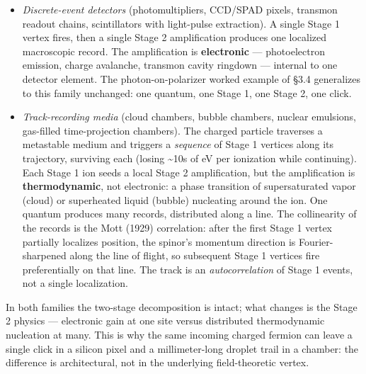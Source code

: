 \documentclass[
]{article}
\providecommand{\tightlist}{%
  \setlength{\itemsep}{0pt}\setlength{\parskip}{0pt}}
\begin{document}
\begin{itemize}
\tightlist
\item
  \emph{Discrete-event detectors} (photomultipliers, CCD/SPAD pixels,
  transmon readout chains, scintillators with light-pulse extraction). A
  single Stage 1 vertex fires, then a single Stage 2 amplification
  produces one localized macroscopic record. The amplification is
  \textbf{electronic} --- photoelectron emission, charge avalanche,
  transmon cavity ringdown --- internal to one detector element. The
  photon-on-polarizer worked example of §3.4 generalizes to this family
  unchanged: one quantum, one Stage 1, one Stage 2, one click.
\item
  \emph{Track-recording media} (cloud chambers, bubble chambers, nuclear
  emulsions, gas-filled time-projection chambers). The charged particle
  traverses a metastable medium and triggers a \emph{sequence} of Stage
  1 vertices along its trajectory, surviving each (losing
  \textasciitilde10s of eV per ionization while continuing). Each Stage
  1 ion seeds a local Stage 2 amplification, but the amplification is
  \textbf{thermodynamic}, not electronic: a phase transition of
  supersaturated vapor (cloud) or superheated liquid (bubble) nucleating
  around the ion. One quantum produces many records, distributed along a
  line. The collinearity of the records is the Mott (1929) correlation:
  after the first Stage 1 vertex partially localizes position, the
  spinor's momentum direction is Fourier-sharpened along the line of
  flight, so subsequent Stage 1 vertices fire preferentially on that
  line. The track is an \emph{autocorrelation} of Stage 1 events, not a
  single localization.
\end{itemize}

In both families the two-stage decomposition is intact; what changes is
the Stage 2 physics --- electronic gain at one site versus distributed
thermodynamic nucleation at many. This is why the same incoming charged
fermion can leave a single click in a silicon pixel and a
millimeter-long droplet trail in a chamber: the difference is
architectural, not in the underlying field-theoretic vertex.
\end{document}
